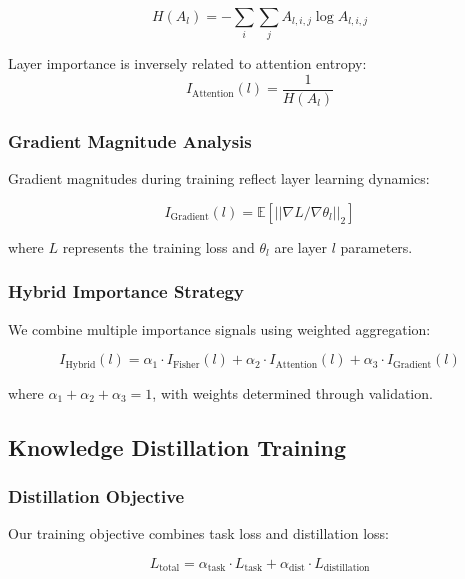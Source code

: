 \documentclass[sigconf]{acmart}
\begin{document}
\begin{equation}
H(A_l) = -\sum_i \sum_j A_{l,i,j} \log A_{l,i,j}
\end{equation}

Layer importance is inversely related to attention entropy:
\begin{equation}
I_{\text{Attention}}(l) = \frac{1}{H(A_l)}
\end{equation}

\subsubsection{Gradient Magnitude Analysis}

Gradient magnitudes during training reflect layer learning dynamics:

\begin{equation}
I_{\text{Gradient}}(l) = \mathbb{E}[||\nabla L/\nabla \theta_l||_2]
\end{equation}

where $L$ represents the training loss and $\theta_l$ are layer $l$ parameters.

\subsubsection{Hybrid Importance Strategy}

We combine multiple importance signals using weighted aggregation:

\begin{equation}
I_{\text{Hybrid}}(l) = \alpha_1 \cdot I_{\text{Fisher}}(l) + \alpha_2 \cdot I_{\text{Attention}}(l) + \alpha_3 \cdot I_{\text{Gradient}}(l)
\end{equation}

where $\alpha_1 + \alpha_2 + \alpha_3 = 1$, with weights determined through validation.

\subsection{Knowledge Distillation Training}

\subsubsection{Distillation Objective}

Our training objective combines task loss and distillation loss:

\begin{equation}
L_{\text{total}} = \alpha_{\text{task}} \cdot L_{\text{task}} + \alpha_{\text{dist}} \cdot L_{\text{distillation}}
\end{equation}
\end{document}
